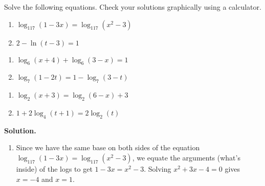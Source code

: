 \documentclass{ximera}
\begin{document}
\smallskip


\smallskip

\begin{example}  \label{LogEqnsEx1} Solve the following equations.  Check your solutions graphically using a calculator.

\begin{multicols}{2}
\begin{enumerate}

\item  $\log_{117}(1-3x) = \log_{117}\left(x^2-3\right)$

\item  $2 - \ln(t-3) = 1$

\setcounter{HW}{\value{enumi}}
\end{enumerate}
\end{multicols}

\begin{multicols}{2}
\begin{enumerate}
\setcounter{enumi}{\value{HW}}

\item  $\log_{6}(x+4) + \log_{6}(3-x) = 1$

\item  $\log_{7}(1-2t) = 1 - \log_{7}(3-t)$
\setcounter{HW}{\value{enumi}}
\end{enumerate}
\end{multicols}

\begin{multicols}{2}
\begin{enumerate}
\setcounter{enumi}{\value{HW}}

\item  $\log_{2}(x+3) = \log_{2}(6-x)+3$

\item  $1 + 2 \log_{4}(t+1) = 2 \log_{2}(t)$

\end{enumerate}
\end{multicols}

{\bf Solution.}

\begin{enumerate}

\item  Since we have the same base on both sides of the equation $\log_{117}(1-3x) = \log_{117}\left(x^2-3\right)$, we equate the arguments (what's inside) of the logs to get $1-3x = x^2-3$.  Solving $x^2+3x-4 = 0$ gives $x=-4$ and $x=1$. 

\smallskip


\end{enumerate}
\end{example}
\end{document}
